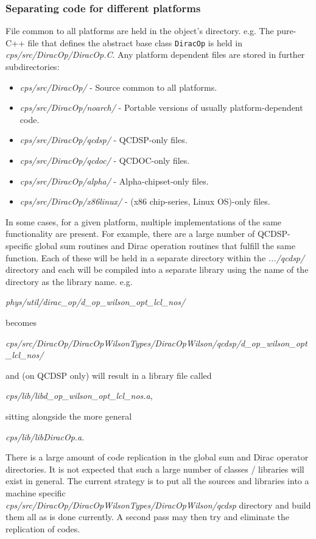 \documentclass[12pt]{article}
\newcommand{\cde}[1]{{\tt #1}}            %
\begin{document}
\subsubsection{Separating code for different platforms}
\label{sssec:sepcode}
File common to all platforms are held in the object's directory.  e.g. The
pure-C++ file that defines the abstract base class \cde{DiracOp} is held in
\emph{cps/src/DiracOp/DiracOp.C}.  Any platform dependent files are stored in
further subdirectories:
\begin{itemize}
\setlength{\itemsep}{0.0cm}
 \item \emph{cps/src/DiracOp/} - Source common to all platforms. 
 \item \emph{cps/src/DiracOp/noarch/} - Portable versions of usually
 platform-dependent code. 
 \item \emph{cps/src/DiracOp/qcdsp/} - QCDSP-only files.
 \item \emph{cps/src/DiracOp/qcdoc/} - QCDOC-only files.
 \item \emph{cps/src/DiracOp/alpha/} - Alpha-chipset-only files.
 \item \emph{cps/src/DiracOp/x86linux/} - (x86 chip-series, Linux OS)-only files.
\end{itemize}

In some cases, for a given platform, multiple implementations of the same
functionality are present.  For example, there are a large number of
QCDSP-specific global sum routines and Dirac operation routines that fulfill
the same function.   Each of these will be held in a separate directory within
the \emph{.../qcdsp/} directory and each will be compiled into a separate
library using the name of the directory as the library name.  e.g.

\emph{phys/util/dirac\_op/d\_op\_wilson\_opt\_lcl\_nos/}

becomes

\emph{cps/src/DiracOp/DiracOpWilsonTypes/DiracOpWilson/qcdsp/d\_op\_wilson\_opt\_lcl\_nos/}

and (on QCDSP only) will result in a library file called 

\emph{cps/lib/libd\_op\_wilson\_opt\_lcl\_nos.a}, 

sitting alongside the more general 

\emph{cps/lib/libDiracOp.a}.

There is a large amount of code replication in the global sum and Dirac
operator directories. It is not expected that such a large number of 
classes / libraries will exist in general. The current strategy is 
to put all the sources and libraries into a machine specific \\
\emph{cps/src/DiracOp/DiracOpWilsonTypes/DiracOpWilson/qcdsp} directory and build them 
all as is done currently. A second pass may then try and eliminate the
replication of codes.
\end{document}
